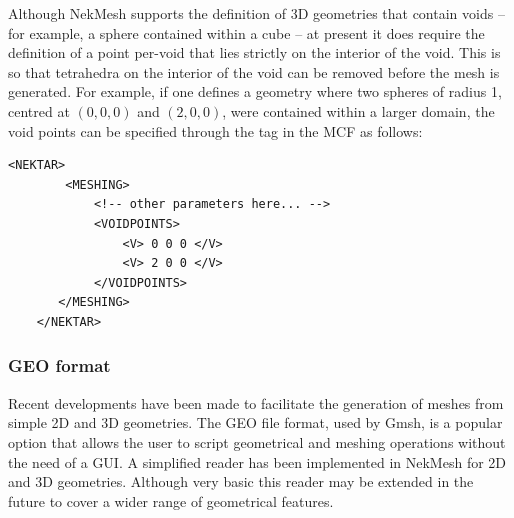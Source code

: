 Although NekMesh supports the definition of 3D geometries that contain voids --
for example, a sphere contained within a cube -- at present it does require the
definition of a point per-void that lies strictly on the interior of the
void. This is so that tetrahedra on the interior of the void can be removed
before the mesh is generated.
%
For example, if one defines a geometry where two spheres of radius 1, centred at
$(0,0,0)$ and $(2,0,0)$, were contained within a larger domain, the void points
can be specified through the  tag in the MCF as follows:

\begin{lstlisting}[style=XmlStyle]
    <NEKTAR>
        <MESHING>
            <!-- other parameters here... -->
            <VOIDPOINTS>
                <V> 0 0 0 </V>
                <V> 2 0 0 </V>
            </VOIDPOINTS>
       </MESHING>
    </NEKTAR>
\end{lstlisting}

\subsubsection{GEO format}

Recent developments have been made to facilitate the generation of meshes from
simple 2D and 3D geometries. The GEO file format, used by Gmsh, is a popular
option that allows the user to script geometrical and meshing operations without
the need of a GUI. A simplified reader has been implemented in NekMesh for 2D
and 3D geometries.  Although very basic this reader may be extended in the
future to cover a wider range of geometrical features.

